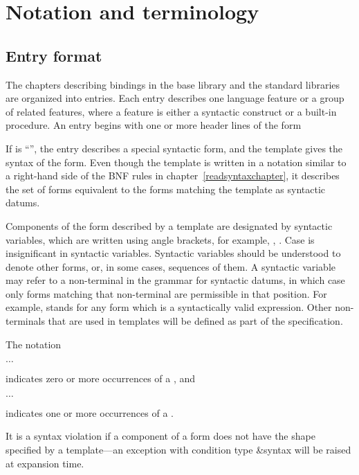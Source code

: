 \chapter{Notation and terminology}
\label{terminologychapter}

\section{Entry format}

The chapters describing bindings in the base library and the standard
libraries are organized
into entries.  Each entry describes one language feature or a group of
related features, where a feature is either a syntactic construct or a
built-in procedure.  An entry begins with one or more header lines of the form

\noindent{}\unpenalty

If  is ``\exprtype'', the entry describes a 
special syntactic form, and the template gives the syntax of the form.  Even
though the template is written in a notation similar to a right-hand
side of the BNF rules in chapter~\ref{readsyntaxchapter}, it describes
the set of forms equivalent to the forms matching the
template as syntactic datums.

Components of the form described by a template are designated
by syntactic variables, which are written using angle brackets, for
example, , .  Case is insignificant
in syntactic variables.  Syntactic variables
should be understood to denote other forms, or, in some cases,
sequences of them.  A syntactic variable may refer to a non-terminal
in the grammar for syntactic datums, in which case only forms matching
that non-terminal are permissible in that position.  For example,
 stands for any form which is a
syntactically valid expression.  Other non-terminals that are used in
templates will be defined as part of the specification.

The notation
\begin{tabbing}
\qquad {} $\ldots$
\end{tabbing}
indicates zero or more occurrences of a , and
\begin{tabbing}
\qquad {}  $\ldots$
\end{tabbing}
indicates one or more occurrences of a .

It is a syntax violation if a component of a form does not have the
shape specified by a template---an exception with condition type
{\cf\&syntax} will be raised at expansion time.

